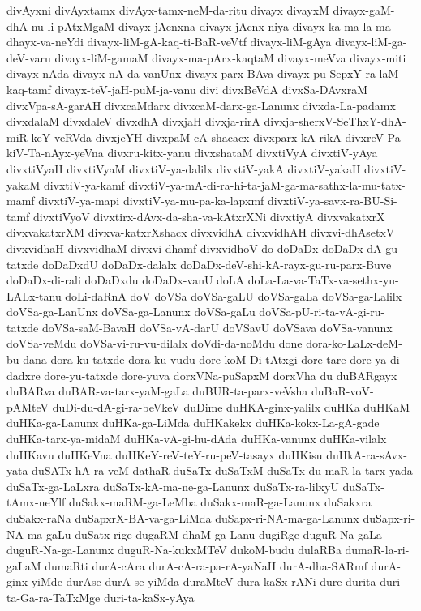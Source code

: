 {divAyxni
divAyxtamx
divAyx-tamx-neM-da-ritu
divayx
divayxM
divayx-gaM-dhA-nu-li-pAtxMgaM
divayx-jAcnxna
divayx-jAcnx-niya
divayx-ka-ma-la-ma-dhayx-va-neYdi
divayx-liM-gA-kaq-ti-BaR-veVtf
divayx-liM-gAya
divayx-liM-ga-deV-varu
divayx-liM-gamaM
divayx-ma-pArx-kaqtaM
divayx-meVva
divayx-miti
divayx-nAda
divayx-nA-da-vanUnx
divayx-parx-BAva
divayx-pu-SepxY-ra-laM-kaq-tamf
divayx-teV-jaH-puM-ja-vanu
divi
divxBeVdA
divxSa-DAvxraM
divxVpa-sA-garAH
divxcaMdarx
divxcaM-darx-ga-Lanunx
divxda-La-padamx
divxdalaM
divxdaleV
divxdhA
divxjaH
divxja-rirA
divxja-sherxV-SeThxY-dhA-miR-keY-veRVda
divxjeYH
divxpaM-cA-shacacx
divxparx-kA-rikA
divxreV-Pa-kiV-Ta-nAyx-yeVna
divxru-kitx-yanu
divxshataM
divxtiVyA
divxtiV-yAya
divxtiVyaH
divxtiVyaM
divxtiV-ya-dalilx
divxtiV-yakA
divxtiV-yakaH
divxtiV-yakaM
divxtiV-ya-kamf
divxtiV-ya-mA-di-ra-hi-ta-jaM-ga-ma-sathx-la-mu-tatx-mamf
divxtiV-ya-mapi
divxtiV-ya-mu-pa-ka-lapxmf
divxtiV-ya-savx-ra-BU-Si-tamf
divxtiVyoV
divxtirx-dAvx-da-sha-va-kAtxrXNi
divxtiyA
divxvakatxrX
divxvakatxrXM
divxva-katxrXshacx
divxvidhA
divxvidhAH
divxvi-dhAsetxV
divxvidhaH
divxvidhaM
divxvi-dhamf
divxvidhoV
do
doDaDx
doDaDx-dA-gu-tatxde
doDaDxdU
doDaDx-dalalx
doDaDx-deV-shi-kA-rayx-gu-ru-parx-Buve
doDaDx-di-rali
doDaDxdu
doDaDx-vanU
doLA
doLa-La-va-TaTx-va-sethx-yu-LALx-tanu
doLi-daRnA
doV
doVSa
doVSa-gaLU
doVSa-gaLa
doVSa-ga-Lalilx
doVSa-ga-LanUnx
doVSa-ga-Lanunx
doVSa-gaLu
doVSa-pU-ri-ta-vA-gi-ru-tatxde
doVSa-saM-BavaH
doVSa-vA-darU
doVSavU
doVSava
doVSa-vanunx
doVSa-veMdu
doVSa-vi-ru-vu-dilalx
doVdi-da-noMdu
done
dora-ko-LaLx-deM-bu-dana
dora-ku-tatxde
dora-ku-vudu
dore-koM-Di-tAtxgi
dore-tare
dore-ya-di-dadxre
dore-yu-tatxde
dore-yuva
dorxVNa-puSapxM
dorxVha
du
duBARgayx
duBARva
duBAR-va-tarx-yaM-gaLa
duBUR-ta-parx-veVsha
duBaR-voV-pAMteV
duDi-du-dA-gi-ra-beVkeV
duDime
duHKA-ginx-yalilx
duHKa
duHKaM
duHKa-ga-Lanunx
duHKa-ga-LiMda
duHKakekx
duHKa-kokx-La-gA-gade
duHKa-tarx-ya-midaM
duHKa-vA-gi-hu-dAda
duHKa-vanunx
duHKa-vilalx
duHKavu
duHKeVna
duHKeY-reV-teY-ru-peV-tasayx
duHKisu
duHkA-ra-sAvx-yata
duSATx-hA-ra-veM-dathaR
duSaTx
duSaTxM
duSaTx-du-maR-la-tarx-yada
duSaTx-ga-LaLxra
duSaTx-kA-ma-ne-ga-Lanunx
duSaTx-ra-lilxyU
duSaTx-tAmx-neYlf
duSakx-maRM-ga-LeMba
duSakx-maR-ga-Lanunx
duSakxra
duSakx-raNa
duSapxrX-BA-va-ga-LiMda
duSapx-ri-NA-ma-ga-Lanunx
duSapx-ri-NA-ma-gaLu
duSatx-rige
dugaRM-dhaM-ga-Lanu
dugiRge
duguR-Na-gaLa
duguR-Na-ga-Lanunx
duguR-Na-kukxMTeV
dukoM-budu
dulaRBa
dumaR-la-ri-gaLaM
dumaRti
durA-cAra
durA-cA-ra-pa-rA-yaNaH
durA-dha-SARmf
durA-ginx-yiMde
durAse
durA-se-yiMda
duraMteV
dura-kaSx-rANi
dure
durita
duri-ta-Ga-ra-TaTxMge
duri-ta-kaSx-yAya
}
